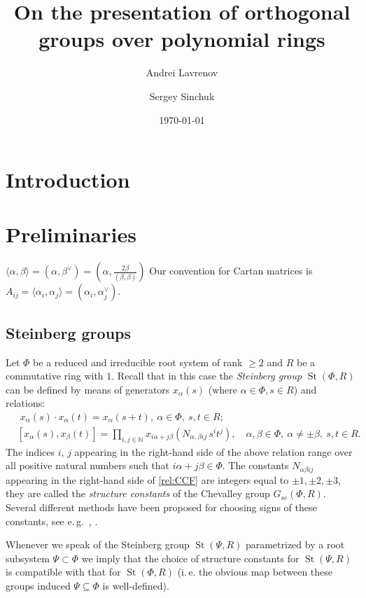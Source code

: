 \documentclass[oneside, 8pt]{amsart}
\title{On the presentation of orthogonal groups over polynomial rings}
\author{Andrei Lavrenov}
\author {Sergey Sinchuk}
\date {\today}
\theoremstyle{remark}
\theoremstyle{definition}
\numberwithin{lemma}{section}
\numberwithin{prop}{section}
\numberwithin{corollary}{section}
\DeclareMathOperator{\St}{St}
\numberwithin{equation}{section}
\begin{document}
\maketitle
\section{Introduction}


\section{Preliminaries}
$\langle \alpha, \beta \rangle = (\alpha, \beta^\vee) = (\alpha, \frac{2\beta}{(\beta, \beta)})$
Our convention for Cartan matrices is 
$A_{ij} = \langle \alpha_i, \alpha_j \rangle = (\alpha_i, \alpha_j^\vee)$.

\subsection{Steinberg groups}
Let $\Phi$ be a reduced and irreducible root system of rank $\geq 2$ and $R$ be a commutative ring with $1$. Recall that in this case the \emph{Steinberg group} $\St(\Phi, R)$ can be defined by means of generators $x_{\alpha}(s)$ (where $\alpha\in\Phi, s\in R$) and relations:
\begin{align}
& \phantom{[}
x_\alpha(s) \cdot x_\alpha(t) = x_\alpha(s+t),\ \alpha\in\Phi,\ s,t\in R; \label{rel:add}\\
& [x_\alpha(s), x_\beta(t)] = \prod\limits_{i,j\in\mathbb{N}}
 x_{i\alpha + j\beta}\left(N_{\alpha,\beta ij}\, s^i t^j\right),\quad \alpha,\beta\in\Phi,\ \alpha\neq\pm\beta,\ s,t\in R. \label{rel:CCF}
\end{align}
The indices $i$, $j$ appearing in the right-hand side of the above relation range over
all positive natural numbers such that $i\alpha + j\beta\in\Phi$.
The constants $N_{\alpha \beta i j}$ appearing in the right-hand side of \eqref{rel:CCF} are integers equal to $\pm 1,\pm 2,\pm 3$, they are called the {\it structure constants} of the Chevalley group $G_{sc}(\Phi, R)$. Several different methods have been proposed for choosing signs of these constants, see e.\,g.~\cite{V00}, \cite[\S~9]{VP}.

Whenever we speak of the Steinberg group $\St(\Psi, R)$ parametrized by a root subsystem $\Psi \subset \Phi$ we imply that the choice of structure constants 
 for $\St(\Psi, R)$ is compatible with that for $\St(\Phi, R)$ (i.\,e. the obvious map between these groups induced $\Psi\subseteq \Phi$ is well-defined).
\end{document}
